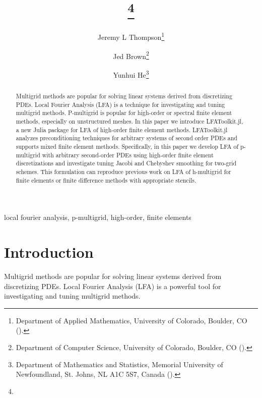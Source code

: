 \documentclass[review]{siamart190516}
\author{
Jeremy L Thompson\thanks{Department of Applied Mathematics, University of Colorado, Boulder, CO
  (\email{jeremy@jeremylt.org}).}
\and Jed Brown\thanks{Department of Computer Science, University of Colorado, Boulder, CO
  (\email{jed@jedbrown.org}).}
\and Yunhui He\thanks{Department of Mathematics and Statistics, Memorial University of Newfoundland, St. Johns, NL A1C 5S7, Canada
  (\email{yunhui.he@mun.ca}).}
}
\title{{\TheTitle}\thanks{\TheFunding}}
\begin{document}
\maketitle

\vspace{1cm}

\begin{abstract}
Multigrid methods are popular for solving linear systems derived from discretizing PDEs.
Local Fourier Analysis (LFA) is a technique for investigating and tuning multigrid methods.
P-multigrid is popular for high-order or spectral finite element methods, especially on unstructured meshes.
In this paper we introduce LFAToolkit.jl, a new Julia package for LFA of high-order finite element methods.
LFAToolkit.jl analyzes preconditioning techniques for arbitrary systems of second order PDEs and supports mixed finite element methods.
Specifically, in this paper we develop LFA of p-multigrid with arbitrary second-order PDEs using high-order finite element discretizations and investigate tuning Jacobi and Chebyshev smoothing for two-grid schemes.
This formulation can reproduce previous work on LFA of h-multigrid for finite elements or finite difference methods with appropriate stencils.
\end{abstract}

\begin{keywords}
  local fourier analysis, p-multigrid, high-order, finite elements
\end{keywords}

\section{Introduction}\label{sec:intro}

Multigrid methods \cite{brandt1982guide, briggs2000multigrid, stuben1982multigrid} are popular for solving linear systems derived from discretizing PDEs.
Local Fourier Analysis (LFA) \cite{brandt1977multi, wienands2004practical} is a powerful tool for investigating and tuning multigrid methods.
\end{document}
